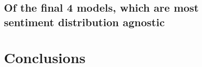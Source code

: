 \documentclass[11pt]{article}
\begin{document}
\subsection{Of the final 4 models, which are most sentiment distribution agnostic}



\section{Conclusions}



\end{document}
